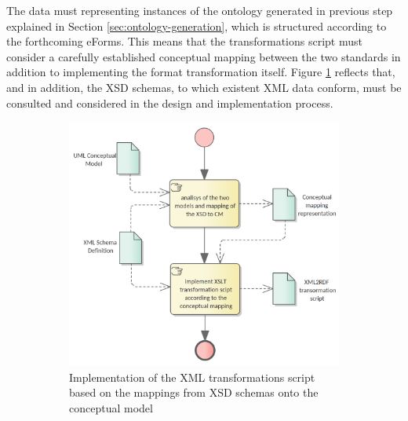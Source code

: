 	The data must representing instances of the ontology generated in previous step explained in Section \ref{sec:ontology-generation}, which is structured according to the forthcoming eForms. This means that the transformations script must consider a carefully established conceptual mapping between the two standards in addition to implementing the format transformation itself. Figure \ref{fig:sub1} reflects that, and in addition, the XSD schemas, to which existent XML data conform, must be consulted and considered in the design and implementation process.

	\begin{figure}[!ht]
		\centering
		\begin{subfigure}[b]{.48\textwidth}
			\centering
			\includegraphics[width=1.05\linewidth]{../img/xml2rdfScriptCreation.png}
			\caption{Implementation of the XML transformations script based on the mappings from XSD schemas onto the conceptual model}
			\label{fig:sub1}
		\end{subfigure}%
		\quad
		\begin{subfigure}[b]{.48\textwidth}
			\centering

\end{subfigure}
\end{figure}
